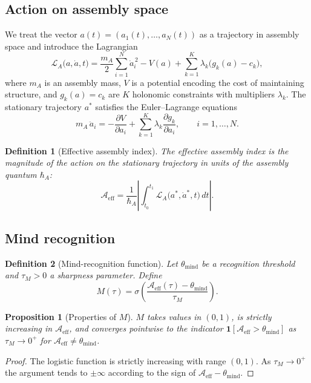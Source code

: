 \documentclass[11pt]{article}
\newtheorem{definition}{Definition}[section]
\newtheorem{proposition}{Proposition}[section]
\theoremstyle{remark}
\newcommand{\Aeff}{\mathcal{A}_{\mathrm{eff}}}
\begin{document}
\subsection{Action on assembly space}

We treat the vector $a(t)=(a_1(t),\dots,a_N(t))$ as a trajectory in assembly space and introduce the Lagrangian
\begin{equation}\label{eq:lagrangian}
\mathcal{L}_A\bigl(a,\dot a,t\bigr)=\frac{m_A}{2}\sum_{i=1}^{N}\dot a_i^{\,2}-V(a)+\sum_{k=1}^{K}\lambda_k\bigl(g_k(a)-c_k\bigr),
\end{equation}
where $m_A$ is an assembly mass, $V$ is a potential encoding the cost of maintaining structure, and $g_k(a)=c_k$ are $K$ holonomic constraints with multipliers $\lambda_k$. The stationary trajectory $a^{\ast}$ satisfies the Euler--Lagrange equations \cite{goldstein2002}
\begin{equation}\label{eq:EL}
m_A\,\ddot a_i=-\frac{\partial V}{\partial a_i}+\sum_{k=1}^{K}\lambda_k\frac{\partial g_k}{\partial a_i},\qquad i=1,\dots,N.
\end{equation}

\begin{definition}[Effective assembly index]\label{def:Aeff}
The \emph{effective assembly index} is the magnitude of the action on the stationary trajectory in units of the assembly quantum $\hbar_A$:
\begin{equation}\label{eq:Aeff}
\Aeff=\frac{1}{\hbar_A}\left|\int_{t_0}^{t_1}\mathcal{L}_A\bigl(a^{\ast},\dot a^{\ast},t\bigr)\,dt\right|.
\end{equation}
\end{definition}

\subsection{Mind recognition}

\begin{definition}[Mind-recognition function]\label{def:M}
Let $\theta_{\mathrm{mind}}$ be a recognition threshold and $\tau_M>0$ a sharpness parameter. Define
\begin{equation}\label{eq:M}
M(\tau)=\sigma\!\left(\frac{\Aeff(\tau)-\theta_{\mathrm{mind}}}{\tau_M}\right).
\end{equation}
\end{definition}

\begin{proposition}[Properties of $M$]\label{prop:M}
$M$ takes values in $(0,1)$, is strictly increasing in $\Aeff$, and converges pointwise to the indicator $\mathbf{1}[\Aeff>\theta_{\mathrm{mind}}]$ as $\tau_M\to 0^{+}$ for $\Aeff\neq\theta_{\mathrm{mind}}$.
\end{proposition}
\begin{proof}
The logistic function is strictly increasing with range $(0,1)$. As $\tau_M\to 0^+$ the argument tends to $\pm\infty$ according to the sign of $\Aeff-\theta_{\mathrm{mind}}$. \qedhere
\end{proof}
\end{document}
